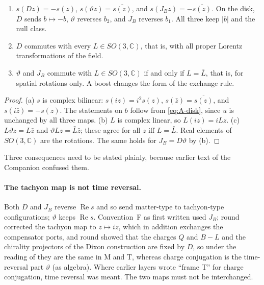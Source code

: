 \begin{proposition}
\label{prop:A-maps}
\begin{enumerate}
\item[(a)] $s(Dz)=-s(z)$, $s(\vartheta z)=\overline{s(z)}$, and $s(J_Bz)=-\overline{s(z)}$. On the disk, $D$ sends
  $b\mapsto-b$, $\vartheta$ reverses $b_2$, and $J_B$ reverses $b_1$. All three keep $|b|$ and the null class.
\item[(b)] $D$ commutes with every $L\in SO(3,\mathbb C)$, that is, with all proper Lorentz transformations
  of the field.
\item[(c)] $\vartheta$ and $J_B$ commute with $L\in SO(3,\mathbb C)$ if and only if $L=\bar L$, that is, for
  spatial rotations only. A boost changes the form of the exchange rule.
\end{enumerate}
\end{proposition}

\begin{proof}
(a) $s$ is complex bilinear: $s(iz)=i^2s(z)$, $s(\bar z)=\overline{s(z)}$, and $s(i\bar z)=-\overline{s(z)}$. The
statements on $b$ follow from \eqref{eq:A-disk}, since $u$ is unchanged by all three maps. (b) $L$ is
complex linear, so $L(iz)=iLz$. (c) $L\vartheta z=L\bar z$ and $\vartheta Lz=\bar L\bar z$; these agree for all
$z$ iff $L=\bar L$. Real elements of $SO(3,\mathbb C)$ are the rotations. The same holds for $J_B=D\vartheta$
by (b).
\end{proof}

Three consequences need to be stated plainly, because earlier text of the Companion confused them.

\paragraph{The tachyon map is not time reversal.}
Both $D$ and $J_B$ reverse $\operatorname{Re}s$ and so send matter-type to tachyon-type configurations;
$\vartheta$ keeps $\operatorname{Re}s$. Convention~F as first written used $J_B$; round 
corrected the tachyon map to $z\mapsto iz$, which in addition exchanges the compensator ports, and round  showed that the charges $Q$ and $B-L$ and the chirality projectors of
the Dixon construction are fixed by $D$, so under the reading of  they are the same in M and T, whereas charge
conjugation is the time-reversal part $\vartheta$ \Established{} (as algebra). Where earlier layers wrote ``frame T'' for charge conjugation,
time reversal was meant. The two maps must not be interchanged.

